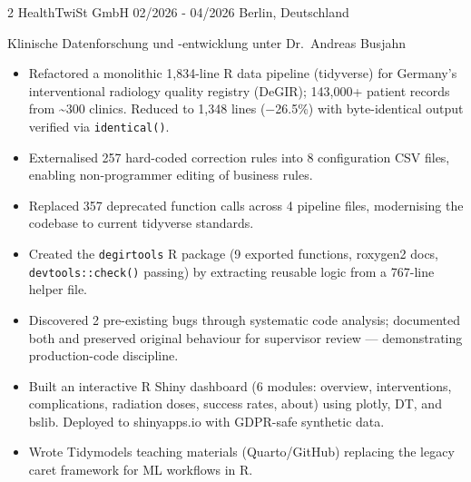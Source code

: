 \documentclass{thejus_cv}
\begin{document}
\begin{paracol}{2}
             {HealthTwiSt GmbH}
             {02/2026 - 04/2026}
             {Berlin, Deutschland}
             {Klinische Datenforschung und -entwicklung unter Dr.~Andreas Busjahn
             \begin{itemize}\setlength{\itemsep}{0.05em}
                   \item Refactored a monolithic 1,834-line R data pipeline (tidyverse) for Germany's interventional radiology quality registry (DeGIR); 143,000+ patient records from \textasciitilde300 clinics. Reduced to 1,348 lines ($-$26.5\%) with byte-identical output verified via \texttt{identical()}.
                   \item Externalised 257 hard-coded correction rules into 8 configuration CSV files, enabling non-programmer editing of business rules.
                   \item Replaced 357 deprecated function calls across 4 pipeline files, modernising the codebase to current tidyverse standards.
                   \item Created the \texttt{degirtools} R package (9 exported functions, roxygen2 docs, \texttt{devtools::check()} passing) by extracting reusable logic from a 767-line helper file.
                   \item Discovered 2 pre-existing bugs through systematic code analysis; documented both and preserved original behaviour for supervisor review --- demonstrating production-code discipline.
                   \item Built an interactive R Shiny dashboard (6 modules: overview, interventions, complications, radiation doses, success rates, about) using plotly, DT, and bslib. Deployed to shinyapps.io with GDPR-safe synthetic data.
                   \item Wrote Tidymodels teaching materials (Quarto/GitHub) replacing the legacy caret framework for ML workflows in R.
               \end{itemize}}


\end{paracol}
\end{document}
